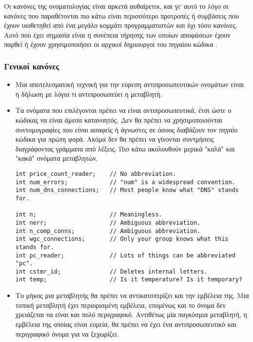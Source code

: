 Οι κανόνες της ονοματολογίας είναι αρκετά αυθαίρετοι, και γι` αυτό το λόγο οι κανόνες που παραθέτονται πιο κάτω είναι περισσότερο προτροπές ή συμβάσεις που έχουν υιοθετηθεί από ένα μεγάλο κομμάτι προγραμματιστών και όχι τόσο κανόνες. Αυτό που έχει σημασία είναι η συνέπεια τήρησης των οποίων αποφάσεων έχουν παρθεί ή έχουν χρησιμοποιήσει οι αρχικοί δημιουργοί του πηγαίου κώδικα \cite{site:google_style}.

\subsubsection[Γενικοί κανόνες]{Γενικοί κανόνες \cite{site:google_style,site:fx_alpha,site:geosoft,sutter2004c++,kernighan1988c}}

\begin{itemize}
\item Μια αποτελεσματική τεχνική για την εύρεση αντιπροσωπευτικών ονομάτων είναι η δήλωση με λόγια τι αντιπροσωπεύει η μεταβλητή. 

\item Τα ονόματα που επιλέγονται πρέπει να είναι αντιπροσωπευτικά, έτσι ώστε ο κώδικας να είναι άμεσα κατανοητός. Δεν θα πρέπει να χρησιμοποιούνται συντομογραφίες που είναι ασαφείς ή άγνωστες σε όσους διαβάζουν τον πηγαίο κώδικα για πρώτη φορά. Ακόμα δεν θα πρέπει να γίνονται συντμήσεις διαγράφοντας γράμματα από λέξεις. Πιο κάτω ακολουθούν μερικά "καλά" και "κακά" ονόματα μεταβλητών.

\begin{lstlisting}[style=cpp]
int price_count_reader;    // No abbreviation.
int num_errors;            // "num" is a widespread convention.
int num_dns_connections;   // Most people know what "DNS" stands for.

int n;                     // Meaningless.
int nerr;                  // Ambiguous abbreviation.
int n_comp_conns;          // Ambiguous abbreviation.
int wgc_connections;       // Only your group knows what this stands for.
int pc_reader;             // Lots of things can be abbreviated "pc".
int cstmr_id;              // Deletes internal letters.
int temp;                  // Is it temperature? Is it temporary?
\end{lstlisting}

\item Το μήκος μια μεταβλητής θα πρέπει να αντικατοπτρίζει και την εμβέλεια της. Μια τοπική μεταβλητή έχει περιορισμένη εμβέλεια, επομένως και το όνομα δεν χρειάζεται να είναι και πολύ περιγραφικό. Αντιθέτως μία παγκόσμια μεταβλητή, η εμβέλεια της οποίας είναι ευρεία, θα πρέπει να έχει ένα αντιπροσωπευτικό και περιγραφικό όνομα για να ξεχωρίζει. 


\end{itemize}
